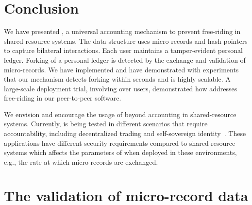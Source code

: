 
\section{Conclusion}
We have presented \ModelName{}, a universal accounting mechanism to prevent free-riding in shared-resource systems.
The \ModelName{} data structure uses micro-records and hash pointers to capture bilateral interactions.
Each user maintains a tamper-evident personal ledger.
Forking of a personal ledger is detected by the exchange and validation of micro-records.
We have implemented \ModelName{} and have demonstrated with experiments that our mechanism detects forking within seconds and is highly scalable.
A large-scale deployment trial, involving over \TrialUsers{} users, demonstrated how \ModelName{} addresses free-riding in our peer-to-peer software.

We envision and encourage the usage of \ModelName{} beyond accounting in shared-resource systems.
Currently, \ModelName{} is being tested in different scenarios that require accountability, including decentralized trading and self-sovereign identity~\cite{de2020xchange,stokkink2018deployment}.
These applications have different security requirements compared to shared-resource systems which affects the parameters of \ModelName{} when deployed in these environments, e.g., the rate at which micro-records are exchanged.

%
%

\newpage


\section{The validation of micro-record data}
\label{sec:validation_record_data}

